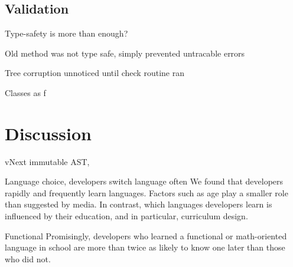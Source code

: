 \documentclass[twoside,openright]{uva-bachelor-thesis}
\begin{document}
	\section{Validation}
		Type-safety is more than enough?
		
		Old method was not type safe, simply prevented untracable errors
		
		Tree corruption unnoticed until check routine ran
		
		Classes as f
	
\chapter{Discussion}
	vNext immutable AST, 
	
	Language choice, developers switch language often
		We found that developers rapidly and frequently learn
		languages. Factors such as age play a smaller role than suggested
		by media. In contrast, which languages developers
		learn is influenced by their education, and in particular, curriculum
		design.
		
	Functional
		Promisingly, developers who learned a functional or	math-oriented language in school are more than twice as likely to know one later than those who did not.



\end{document}
